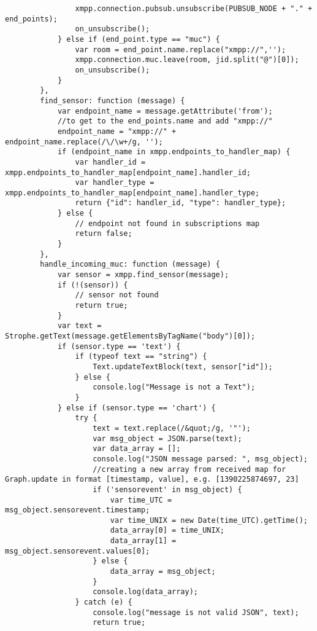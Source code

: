 \begin{lstlisting}
                xmpp.connection.pubsub.unsubscribe(PUBSUB_NODE + "." + end_points);
                on_unsubscribe();
            } else if (end_point.type == "muc") {
                var room = end_point.name.replace("xmpp://",'');
                xmpp.connection.muc.leave(room, jid.split("@")[0]);
                on_unsubscribe();
            }
        },
        find_sensor: function (message) {
            var endpoint_name = message.getAttribute('from');
            //to get to the end_points.name and add "xmpp://"
            endpoint_name = "xmpp://" + endpoint_name.replace(/\/\w+/g, '');
            if (endpoint_name in xmpp.endpoints_to_handler_map) {
                var handler_id = xmpp.endpoints_to_handler_map[endpoint_name].handler_id;
                var handler_type = xmpp.endpoints_to_handler_map[endpoint_name].handler_type;
                return {"id": handler_id, "type": handler_type};
            } else {
                // endpoint not found in subscriptions map
                return false;
            }
        },
        handle_incoming_muc: function (message) {
            var sensor = xmpp.find_sensor(message);
            if (!(sensor)) {
                // sensor not found
                return true;
            }
            var text = Strophe.getText(message.getElementsByTagName("body")[0]);
            if (sensor.type == 'text') {
                if (typeof text == "string") {
                    Text.updateTextBlock(text, sensor["id"]);
                } else {
                    console.log("Message is not a Text");
                }
            } else if (sensor.type == 'chart') {
                try {
                    text = text.replace(/&quot;/g, '"');
                    var msg_object = JSON.parse(text);
                    var data_array = [];
                    console.log("JSON message parsed: ", msg_object);
                    //creating a new array from received map for Graph.update in format [timestamp, value], e.g. [1390225874697, 23]
                    if ('sensorevent' in msg_object) {
                        var time_UTC = msg_object.sensorevent.timestamp;
                        var time_UNIX = new Date(time_UTC).getTime();
                        data_array[0] = time_UNIX;
                        data_array[1] = msg_object.sensorevent.values[0];
                    } else {
                        data_array = msg_object;
                    }
                    console.log(data_array);
                } catch (e) {
                    console.log("message is not valid JSON", text);
                    return true;

\end{lstlisting}
